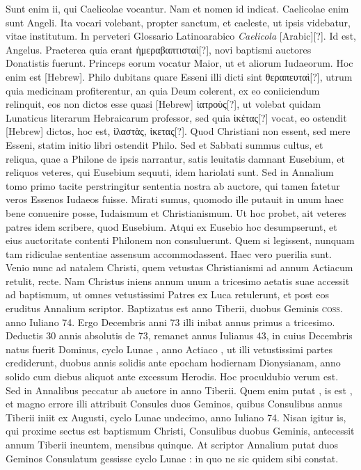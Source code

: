 Sunt enim ii, qui Caelicolae
vocantur.
Nam et nomen id indicat.
Caelicolae enim sunt
Angeli.
Ita vocari volebant, propter sanctum, et caeleste, ut ipsis videbatur,
vitae institutum.
In perveteri Glossario Latinoarabico \textit{Caelicola}
\textarabic{[Arabic]}[?].
Id est, Angelus.
Praeterea quia erant \textgreek{ἡμεραβαπτισταὶ[?]}, novi
baptismi auctores Donatistis fuerunt.
Princeps eorum vocatur
Maior, ut et aliorum Iudaeorum.
Hoc enim est \texthebrew{[Hebrew]}.
Philo dubitans
quare Esseni illi dicti sint \textgreek{θεραπευταὶ[?]},
 utrum quia medicinam profiterentur,
an quia Deum colerent, ex eo coniiciendum relinquit,
eos non dictos esse quasi \texthebrew{[Hebrew]} \textgreek{ἰατροὺς[?]},
 ut volebat quidam Lunaticus
literarum Hebraicarum professor, sed quia \textgreek{ἱκέτας[?]}
 vocat, eo ostendit
\texthebrew{[Hebrew]} dictos, hoc est, \textgreek{ἱλαστὰς, ἱκετας[?]}.
Quod Christiani non essent, sed
mere Esseni, statim initio libri ostendit Philo.
Sed et Sabbati summus
cultus, et reliqua, quae a Philone de ipsis narrantur, satis leuitatis
damnant Eusebium, et reliquos veteres, qui Eusebium sequuti,
idem hariolati sunt.
Sed in Annalium tomo primo tacite perstringitur
sententia nostra ab auctore, qui tamen fatetur veros Essenos Iudaeos
fuisse.
Mirati sumus, quomodo ille putauit in unum haec bene
conuenire posse, Iudaismum et Christianismum.
Ut hoc probet, ait
veteres patres idem scribere, quod Eusebium.
Atqui ex Eusebio
hoc desumpserunt, et eius auctoritate contenti Philonem non consuluerunt.
Quem si legissent, nunquam tam ridiculae sententiae assensum
accommodassent.
Haec vero puerilia sunt.
Venio nunc ad natalem
Christi, quem vetustas Christianismi ad  annum Actiacum
retulit, recte.
Nam Christus iniens annum unum a tricesimo
aetatis suae accessit ad baptismum, ut omnes vetustissimi Patres ex
Luca retulerunt, et post eos eruditus Annalium scriptor.
Baptizatus est anno  Tiberii, duobus Geminis
 \textsc{coss}. anno Iuliano 74.
Ergo  Decembris anni 73 illi inibat annus
 primus a tricesimo.
Deductis 30 annis absolutis de 73, remanet annus Iulianus
43, in cuius  Decembris natus fuerit Dominus, cyclo Lunae
, anno Actiaco ,
 ut illi vetustissimi partes crediderunt,
duobus annis solidis ante epocham hodiernam Dionysianam,
anno solido cum diebus aliquot ante excessum Herodis.
Hoc proculdubio
verum est.
Sed in Annalibus peccatur ab auctore in anno
 Tiberii.
Quem enim putat , is est , et magno errore illi
attribuit Consules duos Geminos, quibus Consulibus annus 
Tiberii iniit ex  Augusti, cyclo Lunae undecimo, anno Iuliano
74.
Nisan igitur is, qui proxime sectus est baptismum Christi,
Consulibus duobus Geminis, antecessit annum  Tiberii ineuntem,
mensibus quinque.
At scriptor Annalium putat duos Geminos
Consulatum gessisse cyclo Lunae : in quo ne sic quidem
sibi constat.

